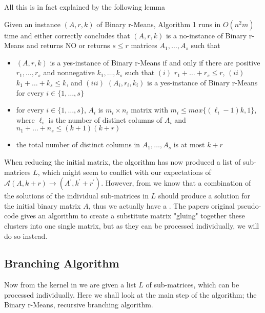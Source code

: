 \documentclass[a4paper]{article}
\begin{document}
All this is in fact explained by the following lemma
\begin{theoremlemma}{\cite[Lemma 5]{fomin_golovach_panolan_2020}}
    Given an instance $(A,r,k)$ of Binary r-Means, Algorithm 1 runs in $O(n^2m)$ time
    and either correctly concludes that $(A,r,k)$ is a no-instance of Binary r-Means and
    returns NO or returns $s \leq r$ matrices $A_1, \dots, A_s$ such that
    \begin{itemize}
        \item $(A,r,k)$ is a yes-instance of Binary r-Means if and only if there are positive
              $r_1,\dots,r_s$ and nonnegative $k_1,\dots,k_s$ such that $(i)$ $r_1 + \dots + r_s \leq r$,
              $(ii)$ $k_1 + \dots + k_s \leq k$, and $(iii)$ $(A_i,r_i,k_i)$ is a yes-instance of Binary
              r-Means for every $i\in\{1,\dots,s\}$
        \item for every $i\in\{1,\dots,s\}$, $A_i$ is $m_i \times n_i$ matrix with
              $m_i \leq max\{(\ell_i - 1)k, 1\}$, where $\ell_i$ is the number of distinct columns
              of $A_i$ and $n_1 + \dots + n_s \leq (k+1)(k+r)$
        \item the total number of distinct columns in $A_1,\dots,A_s$ is at most $k+r$
    \end{itemize}
    \label{lem:5}
\end{theoremlemma}



When reducing the initial matrix, the algorithm has now produced a list of sub-matrices $L$, which might seem to conflict with our expectations
of $\mathcal{A}(A,k+r) \rightarrow (A^\prime,k^\prime+r^\prime)$. However, from  we know that a combination of the solutions of the
individual sub-matrices in $L$ should produce a solution for the initial binary matrix $A$, thus we actually have a .
The papers original pseudo-code \cite{fomin_golovach_panolan_2020} gives an algorithm to create a substitute matrix "gluing" together these clusters into
one single matrix, but as they can be processed individually, we will do so instead.

\subsection{Branching Algorithm}
\label{sec:algo:branching}
Now from the kernel in  we are given a list $L$ of sub-matrices, which can be processed individually. Here we
shall look at the main step of the algorithm; the Binary r-Means, recursive branching algorithm.
\end{document}
